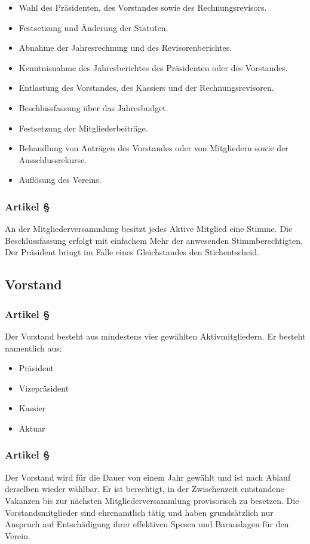 \begin{itemize}
	\item Wahl des Präsidenten, des Vorstandes sowie des
		Rechnungsrevisors.
	\item Festsetzung und Änderung der Statuten.
	\item Abnahme der Jahresrechnung und des Revisorenberichtes.
	\item Kenntnisnahme des Jahresberichtes des Präsidenten oder des
		Vorstandes.
	\item Entlastung des Vorstandes, des Kassiers und der
		Rechnungsrevisoren.
	\item Beschlussfassung über das Jahresbudget.
	\item Festsetzung der Mitgliederbeiträge.
	\item Behandlung von Anträgen des Vorstandes oder von Mitgliedern
		sowie der Ausschlussrekurse.
	\item Auflösung des Vereins.
\end{itemize}

\subsubsection*{Artikel §\articlenumber}
An der Mitgliederversammlung besitzt jedes Aktive Mitglied eine Stimme. Die
Beschlussfassung erfolgt mit einfachem Mehr der anwesenden Stimmberechtigten. 
Der Präsident bringt im Falle eines Gleichstandes den Stichentscheid.

\subsection{Vorstand}

\subsubsection*{Artikel §\articlenumber}
Der Vorstand besteht aus mindestens vier gewählten Aktivmitgliedern.
Er besteht namentlich aus:

\begin{itemize}
	\item Präsident
	\item Vizepräsident
	\item Kassier
	\item Aktuar
\end{itemize}
 
\subsubsection*{Artikel §\articlenumber}
Der Vorstand wird für die Dauer von einem Jahr gewählt und ist nach Ablauf
derselben wieder wählbar.
Er ist berechtigt, in der Zwischenzeit entstandene Vakanzen bis zur nächsten
Mitgliederversammlung provisorisch zu besetzen. Die Vorstandsmitglieder sind
ehrenamtlich tätig und haben grundsätzlich nur Anspruch auf Entschädigung
ihrer effektiven Spesen und Barauslagen für den Verein.

